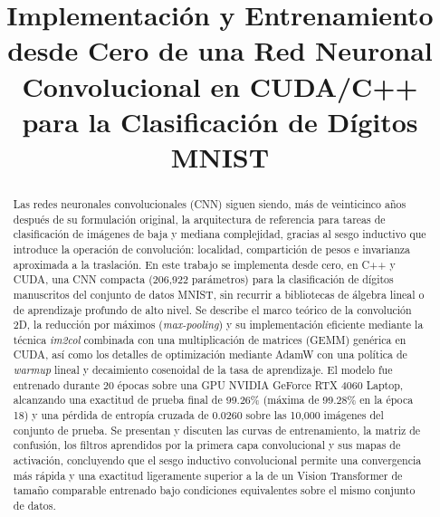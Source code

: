 \documentclass[conference]{IEEEtran}
\begin{document}
\title{\LARGE Implementación y Entrenamiento desde Cero de una Red Neuronal Convolucional en CUDA/C++ para la Clasificación de Dígitos MNIST}

\author{
  \and
}

\maketitle

\begin{abstract}
Las redes neuronales convolucionales (CNN) siguen siendo, más de veinticinco años después de su formulación original, la arquitectura de referencia para tareas de clasificación de imágenes de baja y mediana complejidad, gracias al sesgo inductivo que introduce la operación de convolución: localidad, compartición de pesos e invarianza aproximada a la traslación. En este trabajo se implementa desde cero, en C++ y CUDA, una CNN compacta (206{,}922 parámetros) para la clasificación de dígitos manuscritos del conjunto de datos MNIST, sin recurrir a bibliotecas de álgebra lineal o de aprendizaje profundo de alto nivel. Se describe el marco teórico de la convolución 2D, la reducción por máximos (\emph{max-pooling}) y su implementación eficiente mediante la técnica \emph{im2col} combinada con una multiplicación de matrices (GEMM) genérica en CUDA, así como los detalles de optimización mediante AdamW con una política de \emph{warmup} lineal y decaimiento cosenoidal de la tasa de aprendizaje. El modelo fue entrenado durante 20 épocas sobre una GPU NVIDIA GeForce RTX 4060 Laptop, alcanzando una exactitud de prueba final de 99.26\% (máxima de 99.28\% en la época 18) y una pérdida de entropía cruzada de 0.0260 sobre las 10{,}000 imágenes del conjunto de prueba. Se presentan y discuten las curvas de entrenamiento, la matriz de confusión, los filtros aprendidos por la primera capa convolucional y sus mapas de activación, concluyendo que el sesgo inductivo convolucional permite una convergencia más rápida y una exactitud ligeramente superior a la de un Vision Transformer de tamaño comparable entrenado bajo condiciones equivalentes sobre el mismo conjunto de datos.
\end{abstract}
\end{document}
